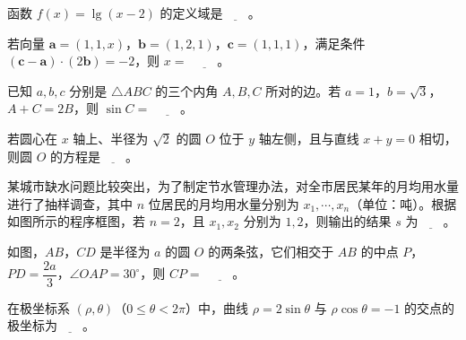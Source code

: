 \begin{question}
函数 $f(x)=\lg(x-2)$ 的定义域是$\underline{\qquad}$。

\end{question}
\begin{question}
若向量 $\boldsymbol a=(1,1,x)$，$\boldsymbol b=(1,2,1)$，$\boldsymbol c=(1,1,1)$，满足条件 $(\boldsymbol c-\boldsymbol a)\cdot(2\boldsymbol b)=-2$，则 $x=$ $\underline{\qquad}$。

\end{question}
\begin{question}
已知 $a,b,c$ 分别是 $\triangle ABC$ 的三个内角 $A,B,C$ 所对的边。若 $a=1$，$b=\sqrt3$，$A+C=2B$，则 $\sin C=$ $\underline{\qquad}$。

\end{question}
\begin{question}
若圆心在 $x$ 轴上、半径为 $\sqrt2$ 的圆 $O$ 位于 $y$ 轴左侧，且与直线 $x+y=0$ 相切，则圆 $O$ 的方程是$\underline{\qquad}$。

\Needspace{0.4\textheight}
\end{question}
\begingroup
\renewenvironment{question}{\Needspace{0.5\textheight}}{}
\begin{question}
某城市缺水问题比较突出，为了制定节水管理办法，对全市居民某年的月均用水量进行了抽样调查，其中 $n$ 位居民的月均用水量分别为 $x_1,\cdots,x_n$（单位：吨）。根据如图所示的程序框图，若 $n=2$，且 $x_1,x_2$ 分别为 $1,2$，则输出的结果 $s$ 为$\underline{\qquad}$。
\nopagebreak[4]
\begin{center}\end{center}
\nopagebreak[4]
\Needspace{0.4\textheight}
\end{question}
\endgroup
\begingroup
\renewenvironment{question}{\Needspace{0.5\textheight}}{}
\begin{question}
如图，$AB$，$CD$ 是半径为 $a$ 的圆 $O$ 的两条弦，它们相交于 $AB$ 的中点 $P$，$PD=\dfrac{2a}3$，$\angle OAP=30^\circ$，则 $CP=$ $\underline{\qquad}$。
\nopagebreak[4]
\begin{center}\end{center}
\nopagebreak[4]
\end{question}
\endgroup
\begin{question}
在极坐标系 $(\rho,\theta)$（$0\leqslant\theta<2\pi$）中，曲线 $\rho=2\sin\theta$ 与 $\rho\cos\theta=-1$ 的交点的极坐标为$\underline{\qquad}$。

\end{question}

